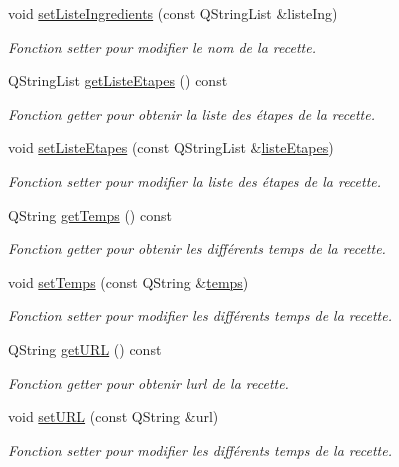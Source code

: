 \begin{DoxyCompactItemize}
void \hyperlink{classRecette_a08b6eff8e2b20a39edf7fc04c2a827f9}{set\+Liste\+Ingredients} (const Q\+String\+List \&liste\+Ing)
\begin{DoxyCompactList}\small\item\em Fonction setter pour modifier le nom de la recette. \end{DoxyCompactList}\item 
Q\+String\+List \hyperlink{classRecette_a3b2807fe1f55431bcd632bff2332c6e7}{get\+Liste\+Etapes} () const
\begin{DoxyCompactList}\small\item\em Fonction getter pour obtenir la liste des étapes de la recette. \end{DoxyCompactList}\item 
void \hyperlink{classRecette_a3a5b4231baeeae0a30588d1ca29c7e4e}{set\+Liste\+Etapes} (const Q\+String\+List \&\hyperlink{classRecette_addbf40a642849e6583ac7fd3e2059e0d}{liste\+Etapes})
\begin{DoxyCompactList}\small\item\em Fonction setter pour modifier la liste des étapes de la recette. \end{DoxyCompactList}\item 
Q\+String \hyperlink{classRecette_a9ac38f333d17699fb6601bca332d8567}{get\+Temps} () const
\begin{DoxyCompactList}\small\item\em Fonction getter pour obtenir les différents temps de la recette. \end{DoxyCompactList}\item 
void \hyperlink{classRecette_a9556fdb039545e6010b8ee1ab36068b7}{set\+Temps} (const Q\+String \&\hyperlink{classRecette_a6165aaa32628fc48e4467f59c4cdcf99}{temps})
\begin{DoxyCompactList}\small\item\em Fonction setter pour modifier les différents temps de la recette. \end{DoxyCompactList}\item 
Q\+String \hyperlink{classRecette_ab06006324a8201e9967b53273dbf2751}{get\+U\+RL} () const
\begin{DoxyCompactList}\small\item\em Fonction getter pour obtenir l\textquotesingle{}url de la recette. \end{DoxyCompactList}\item 
void \hyperlink{classRecette_aa8439657ab66d74a3fd38df05b8594d1}{set\+U\+RL} (const Q\+String \&url)
\begin{DoxyCompactList}\small\item\em Fonction setter pour modifier les différents temps de la recette. \end{DoxyCompactList}\item 

\end{DoxyCompactItemize}
